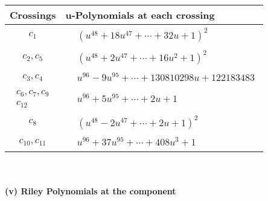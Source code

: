 \documentclass[1p]{elsarticle_modified}
\theoremstyle{definition}
\begin{document}
\begin{tabular}{m{50pt}|m{274pt}}
Crossings & \hspace{64pt}u-Polynomials at each crossing \\
\hline $$\begin{aligned}c_{1}\end{aligned}$$&$\begin{aligned}
&(u^{48}+18 u^{47}+\cdots+32 u+1)^{2}
\end{aligned}$\\
\hline $$\begin{aligned}c_{2},c_{5}\end{aligned}$$&$\begin{aligned}
&(u^{48}+2 u^{47}+\cdots+16 u^2+1)^{2}
\end{aligned}$\\
\hline $$\begin{aligned}c_{3},c_{4}\end{aligned}$$&$\begin{aligned}
&u^{96}-9 u^{95}+\cdots+130810298 u+122183483
\end{aligned}$\\
\hline $$\begin{aligned}c_{6},c_{7},c_{9}\\c_{12}\end{aligned}$$&$\begin{aligned}
&u^{96}+5 u^{95}+\cdots+2 u+1
\end{aligned}$\\
\hline $$\begin{aligned}c_{8}\end{aligned}$$&$\begin{aligned}
&(u^{48}-2 u^{47}+\cdots+2 u+1)^{2}
\end{aligned}$\\
\hline $$\begin{aligned}c_{10},c_{11}\end{aligned}$$&$\begin{aligned}
&u^{96}+37 u^{95}+\cdots+408 u^3+1
\end{aligned}$\\
\hline
\end{tabular}\\~\\
\newpage\renewcommand{\arraystretch}{1}
\flushleft \textbf{(v) Riley Polynomials at the component}\newline \\
\end{document}
